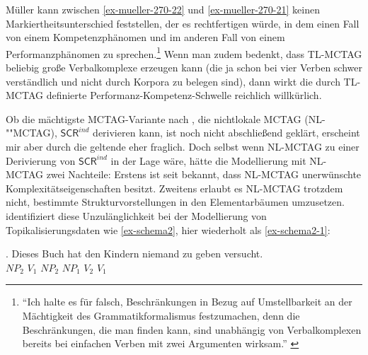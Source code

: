 Müller kann zwischen \ref{ex-mueller-270-22} und \ref{ex-mueller-270-21} keinen Markiertheitsunterschied feststellen, der es rechtfertigen würde, in dem einen Fall von einem Kompetenzphänomen und im anderen Fall von einem Performanzphänomen zu sprechen.\footnote{"`Ich halte es für falsch, Beschränkungen in Bezug auf Umstellbarkeit an der Mächtigkeit des Grammatikformalismus festzumachen, denn die Beschränkungen, die man finden kann, sind unabhängig von Verbalkomplexen bereits bei einfachen Verben mit zwei Argumenten wirksam."' \citep[269]{Mueller:10}} Wenn man zudem bedenkt, dass TL-MCTAG beliebig gro\ss e Verbalkomplexe erzeugen kann (die ja schon bei vier Verben schwer verständlich und nicht durch Korpora zu belegen sind), dann wirkt die durch TL-MCTAG definierte Performanz-Kompetenz-Schwelle reichlich willkürlich. %

Ob die mächtigste MCTAG-Variante nach \cite{Weir:88}, die nichtlokale MCTAG (NL-""MCTAG), $\mathsf{SCR}^{ind}$ derivieren kann, ist noch nicht abschlie\ss end geklärt, erscheint mir aber durch die geltende  eher fraglich. Doch selbst wenn NL-MCTAG zu einer Derivierung von $\mathsf{SCR}^{ind}$ in der Lage wäre, hätte die Modellierung mit NL-MCTAG zwei Nachteile: Erstens ist seit \cite{Rambow:Satta:92} bekannt, dass NL-MCTAG unerwünschte Komplexitätseigenschaften besitzt. Zweitens erlaubt es NL-MCTAG trotzdem nicht, bestimmte Strukturvorstellungen in den Elementarbäumen umzusetzen. \citet[56f]{Rambow:94} identifiziert diese Unzulänglichkeit bei der Modellierung von Topikalisierungsdaten wie \ref{ex-schema2}, hier wiederholt als \ref{ex-schema2-1}:

\exg. {Dieses Buch} hat {den Kindern} niemand {zu geben} versucht.  \\
$\mathit{NP}_2$ $V_1$ $\mathit{NP}_2$ $\mathit{NP}_1$ $V_2$ $V_1$ \\
\citep[42]{Rambow:94} \label{ex-schema2-1}


